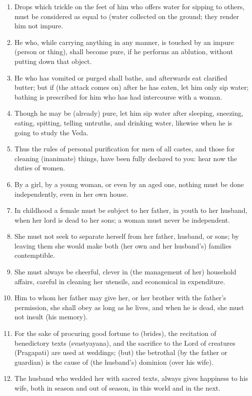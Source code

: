\begin{enumerate}
\item Drops which trickle on the feet of him who offers water for sipping to others, must be considered as equal to (water collected on the ground; they render him not impure.
\item He who, while carrying anything in any manner, is touched by an impure (person or thing), shall become pure, if he performs an ablution, without putting down that object.
\item He who has vomited or purged shall bathe, and afterwards eat clarified butter; but if (the attack comes on) after he has eaten, let him only sip water; bathing is prescribed for him who has had intercourse with a woman.
\item Though he may be (already) pure, let him sip water after sleeping, sneezing, eating, spitting, telling untruths, and drinking water, likewise when he is going to study the Veda.
\item Thus the rules of personal purification for men of all castes, and those for cleaning (inanimate) things, have been fully declared to you: hear now the duties of women.
\item By a girl, by a young woman, or even by an aged one, nothing must be done independently, even in her own house.
\item In childhood a female must be subject to her father, in youth to her husband, when her lord is dead to her sons; a woman must never be independent.
\item She must not seek to separate herself from her father, husband, or sons; by leaving them she would make both (her own and her husband's) families contemptible.
\item She must always be cheerful, clever in (the management of her) household affairs, careful in cleaning her utensils, and economical in expenditure.
\item Him to whom her father may give her, or her brother with the father's permission, she shall obey as long as he lives, and when he is dead, she must not insult (his memory).
\item For the sake of procuring good fortune to (brides), the recitation of benedictory texts (svastyayana), and the sacrifice to the Lord of creatures (Pragapati) are used at weddings; (but) the betrothal (by the father or guardian) is the cause of (the husband's) dominion (over his wife).
\item The husband who wedded her with sacred texts, always gives happiness to his wife, both in season and out of season, in this world and in the next.

\end{enumerate}
